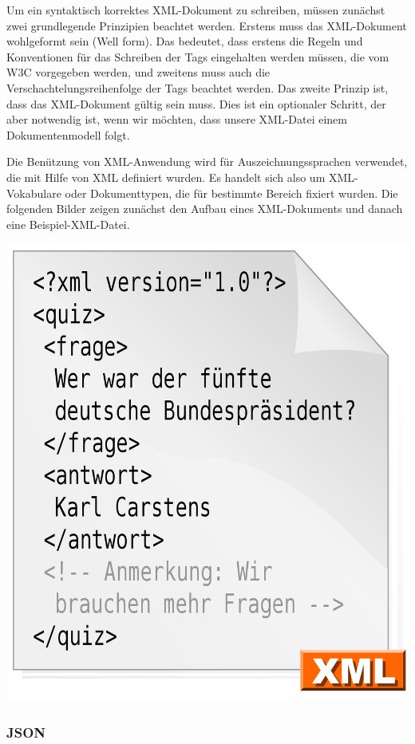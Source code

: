 Um ein syntaktisch korrektes XML-Dokument zu schreiben, müssen zunächst zwei grundlegende Prinzipien beachtet werden. Erstens muss das XML-Dokument wohlgeformt sein (Well form). Das bedeutet, dass erstens die Regeln und Konventionen für das Schreiben der Tags eingehalten werden müssen, die vom W3C vorgegeben werden, und zweitens muss auch die Verschachtelungsreihenfolge der Tags beachtet werden. Das zweite Prinzip ist, dass das XML-Dokument gültig sein muss. Dies ist ein optionaler Schritt, der aber notwendig ist, wenn wir möchten, dass unsere XML-Datei einem Dokumentenmodell folgt.

Die Benützung von XML-Anwendung wird für Auszeichnungssprachen verwendet, die mit Hilfe von XML definiert wurden. Es handelt sich also um XML-Vokabulare oder Dokumenttypen, die für bestimmte Bereich fixiert wurden.\cite{helmut36}
Die folgenden Bilder zeigen zunächst den Aufbau eines XML-Dokuments und danach eine Beispiel-XML-Datei.

\begin{center}

\includegraphics[width=.7\textwidth]{./images/8.Xml_datei_Beispiel}
\end{center}

\subsubsection{JSON}

